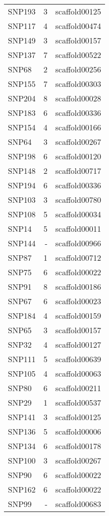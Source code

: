 \documentclass[smallextended]{svjour3}       %
\begin{document}
\begin{longtable}{lrl}
  SNP193 &   3 & scaffold00125 \\ 
  SNP117 &   4 & scaffold00474 \\ 
  SNP149 &   3 & scaffold00157 \\ 
  SNP137 &   7 & scaffold00522 \\ 
  SNP68 &   2 & scaffold00256 \\ 
  SNP155 &   7 & scaffold00303 \\ 
  SNP204 &   8 & scaffold00028 \\ 
  SNP183 &   6 & scaffold00336 \\ 
  SNP154 &   4 & scaffold00166 \\ 
  SNP64 &   3 & scaffold00267 \\ 
  SNP198 &   6 & scaffold00120 \\ 
  SNP148 &   2 & scaffold00717 \\ 
  SNP194 &   6 & scaffold00336 \\ 
  SNP103 &   3 & scaffold00780 \\ 
  SNP108 &   5 & scaffold00034 \\ 
  SNP14 &   5 & scaffold00011 \\ 
  SNP144 & - & scaffold00966 \\ 
  SNP87 &   1 & scaffold00712 \\ 
  SNP75 &   6 & scaffold00022 \\ 
  SNP91 &   8 & scaffold00186 \\ 
  SNP67 &   6 & scaffold00023 \\ 
  SNP184 &   4 & scaffold00159 \\ 
  SNP65 &   3 & scaffold00157 \\ 
  SNP32 &   4 & scaffold00127 \\ 
  SNP111 &   5 & scaffold00639 \\ 
  SNP105 &   4 & scaffold00063 \\ 
  SNP80 &   6 & scaffold00211 \\ 
  SNP29 &   1 & scaffold00537 \\ 
  SNP141 &   3 & scaffold00125 \\ 
  SNP136 &   5 & scaffold00006 \\ 
  SNP134 &   6 & scaffold00178 \\ 
  SNP100 &   3 & scaffold00267 \\ 
  SNP90 &   6 & scaffold00022 \\ 
  SNP162 &   6 & scaffold00022 \\ 
  SNP99 & - & scaffold00683 \\ 

\end{longtable}
\end{document}
